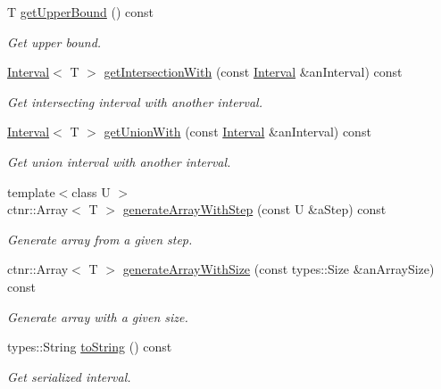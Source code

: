 \begin{DoxyCompactItemize}
T \hyperlink{classlibrary_1_1math_1_1obj_1_1_interval_a97d09e9c5e7f67b6ddf162af01a8066e}{get\+Upper\+Bound} () const
\begin{DoxyCompactList}\small\item\em Get upper bound. \end{DoxyCompactList}\item 
\hyperlink{classlibrary_1_1math_1_1obj_1_1_interval}{Interval}$<$ T $>$ \hyperlink{classlibrary_1_1math_1_1obj_1_1_interval_a2f23ca14d71c454417270218132423de}{get\+Intersection\+With} (const \hyperlink{classlibrary_1_1math_1_1obj_1_1_interval}{Interval} \&an\+Interval) const
\begin{DoxyCompactList}\small\item\em Get intersecting interval with another interval. \end{DoxyCompactList}\item 
\hyperlink{classlibrary_1_1math_1_1obj_1_1_interval}{Interval}$<$ T $>$ \hyperlink{classlibrary_1_1math_1_1obj_1_1_interval_a4183db388b6a63429a031d3687b20ecf}{get\+Union\+With} (const \hyperlink{classlibrary_1_1math_1_1obj_1_1_interval}{Interval} \&an\+Interval) const
\begin{DoxyCompactList}\small\item\em Get union interval with another interval. \end{DoxyCompactList}\item 
{\footnotesize template$<$class U $>$ }\\ctnr\+::\+Array$<$ T $>$ \hyperlink{classlibrary_1_1math_1_1obj_1_1_interval_ad453aeaec68c18421a7c93ac7c14fa48}{generate\+Array\+With\+Step} (const U \&a\+Step) const
\begin{DoxyCompactList}\small\item\em Generate array from a given step. \end{DoxyCompactList}\item 
ctnr\+::\+Array$<$ T $>$ \hyperlink{classlibrary_1_1math_1_1obj_1_1_interval_a250e05a1f463f107952b437e5ff4f4d2}{generate\+Array\+With\+Size} (const types\+::\+Size \&an\+Array\+Size) const
\begin{DoxyCompactList}\small\item\em Generate array with a given size. \end{DoxyCompactList}\item 
types\+::\+String \hyperlink{classlibrary_1_1math_1_1obj_1_1_interval_ad75c400daf533c35bc91da8c50b00a9e}{to\+String} () const
\begin{DoxyCompactList}\small\item\em Get serialized interval. \end{DoxyCompactList}\item 

\end{DoxyCompactItemize}
